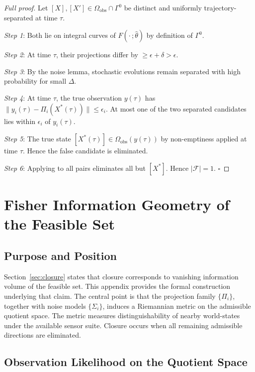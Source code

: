 \documentclass[12pt, oneside]{article}
\begin{document}
\begin{proof}[Full proof]
Let $[X],[X'] \in \Omega_{\mathrm{obs}} \cap \Gamma^0$ be distinct and uniformly
trajectory-separated at time $\tau$.

\textit{Step 1}: Both lie on integral curves of $F(\cdot\,;\hat{\theta})$ by definition of
$\Gamma^0$.

\textit{Step 2}: At time $\tau$, their projections differ by $\ge \epsilon + \delta > \epsilon$.

\textit{Step 3}: By the noise lemma, stochastic evolutions remain separated with high
probability for small $\Delta$.

\textit{Step 4}: At time $\tau$, the true observation $y(\tau)$ has
$\|y_i(\tau) - \Pi_i(X^*(\tau))\| \le \epsilon_i$. At most one of the two separated
candidates lies within $\epsilon_i$ of $y_i(\tau)$.

\textit{Step 5}: The true state $[X^*(\tau)] \in \Omega_{\mathrm{obs}}(y(\tau))$ by
non-emptiness applied at time $\tau$. Hence the false candidate is eliminated.

\textit{Step 6}: Applying to all pairs eliminates all but $[X^*]$. Hence
$|\mathcal{F}| = 1$. $\square$
\end{proof}

\section{Fisher Information Geometry of the Feasible Set}
\label{app:fisher}

\subsection{Purpose and Position}

Section~\ref{sec:closure} states that closure corresponds to vanishing information volume
of the feasible set. This appendix provides the formal construction underlying that claim.
The central point is that the projection family $\{\Pi_i\}$, together with noise models
$\{\Sigma_i\}$, induces a Riemannian metric on the admissible quotient space. The metric
measures distinguishability of nearby world-states under the available sensor suite.
Closure occurs when all remaining admissible directions are eliminated.

\subsection{Observation Likelihood on the Quotient Space}
\end{document}
